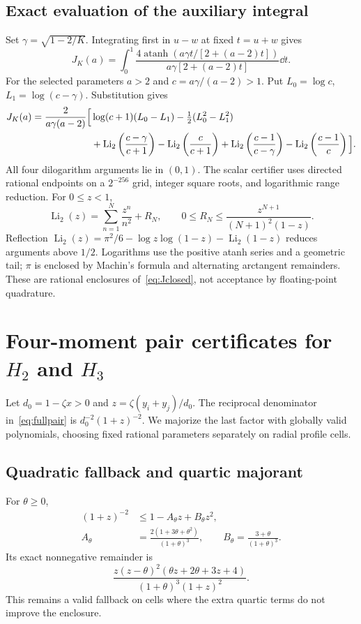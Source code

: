 \documentclass[11pt,a4paper]{article}
\theoremstyle{definition}\newtheorem{definition}[theorem]{Definition}
\theoremstyle{remark}\newtheorem{remark}[theorem]{Remark}
\newcommand{\Li}{\operatorname{Li}_2}
\numberwithin{equation}{section}
\begin{document}
\subsection{Exact evaluation of the auxiliary integral}
Set $\gamma=\sqrt{1-2/K}$. Integrating first in $u-w$ at fixed $t=u+w$ gives
\[
 J_K(a)=\int_0^1
 \frac{4\operatorname{atanh}(a\gamma t/[2+(a-2)t])}
 {a\gamma[2+(a-2)t]}\dd t.
\]
For the selected parameters $a>2$ and $c=a\gamma/(a-2)>1$. Put $L_0=\log c$, $L_1=\log(c-\gamma)$. Substitution gives
\begin{align}\label{eq:Jclosed}
J_K(a)=\frac{2}{a\gamma(a-2)}\Big[&\log(c+1)(L_0-L_1)-\tfrac12(L_0^2-L_1^2)\notag\\
 &+\Li\left(\frac{c-\gamma}{c+1}\right)-\Li\left(\frac{c}{c+1}\right)
 +\Li\left(\frac{c-1}{c-\gamma}\right)-\Li\left(\frac{c-1}{c}\right)\Big].
\end{align}
All four dilogarithm arguments lie in $(0,1)$. The scalar certifier uses directed rational endpoints on a $2^{-256}$ grid, integer square roots, and logarithmic range reduction. For $0\le z<1$,
\[
 \Li(z)=\sum_{n=1}^N\frac{z^n}{n^2}+R_N,\qquad
 0\le R_N\le\frac{z^{N+1}}{(N+1)^2(1-z)}.
\]
Reflection $\Li(z)=\pi^2/6-\log z\log(1-z)-\Li(1-z)$ reduces arguments above $1/2$. Logarithms use the positive atanh series and a geometric tail; $\pi$ is enclosed by Machin's formula and alternating arctangent remainders. These are rational enclosures of~\eqref{eq:Jclosed}, not acceptance by floating-point quadrature.

\section{Four-moment pair certificates for \texorpdfstring{$H_2$}{H2} and \texorpdfstring{$H_3$}{H3}}\label{sec:fourmoments}
Let $d_0=1-\zeta x>0$ and $z=\zeta(y_i+y_j)/d_0$. The reciprocal denominator in~\eqref{eq:fullpair} is $d_0^{-2}(1+z)^{-2}$. We majorize the last factor with globally valid polynomials, choosing fixed rational parameters separately on radial profile cells.

\subsection{Quadratic fallback and quartic majorant}
For $\theta\ge0$,
\begin{align*}
 (1+z)^{-2}&\le 1-A_\theta z+B_\theta z^2,\\
 A_\theta&=\frac{2(1+3\theta+\theta^2)}{(1+\theta)^3},\qquad
 B_\theta=\frac{3+\theta}{(1+\theta)^3}.
\end{align*}
Its exact nonnegative remainder is
\[
 \frac{z(z-\theta)^2(\theta z+2\theta+3z+4)}{(1+\theta)^3(1+z)^2}.
\]
This remains a valid fallback on cells where the extra quartic terms do not improve the enclosure.
\end{document}
